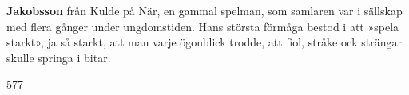 \textbf{Jakobsson} från Kulde på När, en gammal spelman, som samlaren var i sällskap med flera gånger under ungdomstiden.
Hans största förmåga bestod i att »spela starkt», ja så starkt, att man varje ögonblick trodde,
att fiol, stråke ock strängar skulle springa i bitar. 

577 
